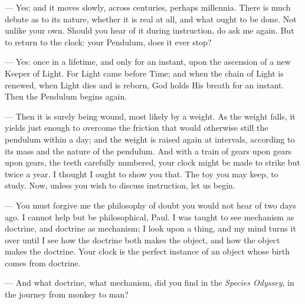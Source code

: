 \begin{room}
--- Yes; and it moves slowly, across centuries, perhaps millennia. There is much debate as to its nature, whether it is real at all, and what ought to be done. Not unlike your own. Should you hear of it during instruction, do ask me again. But to return to the clock: your Pendulum, does it ever stop?

--- Yes: once in a lifetime, and only for an instant, upon the ascension of a new Keeper of Light. For Light came before Time; and when the chain of Light is renewed, when Light dies and is reborn, God holds His breath for an instant. Then the Pendulum begins again.

--- Then it is surely being wound, most likely by a weight. As the weight falls, it yields just enough to overcome the friction that would otherwise still the pendulum within a day; and the weight is raised again at intervals, according to its mass and the nature of the pendulum. And with a train of gears upon gears upon gears, the teeth carefully numbered, your clock might be made to strike but twice a year. I thought I ought to show you that. The toy you may keep, to study. Now, unless you wish to discuss instruction, let us begin.

--- You must forgive me the philosophy of doubt you would not hear of two days ago. I cannot help but be philosophical, Paul. I was taught to see mechanism as doctrine, and doctrine as mechanism; I look upon a thing, and my mind turns it over until I see how the doctrine both makes the object, and how the object makes the doctrine. Your clock is the perfect instance of an object whose birth comes from doctrine.

--- And what doctrine, what mechanism, did you find in the \textit{Species Odyssey}, in the journey from monkey to man?


\end{room}
